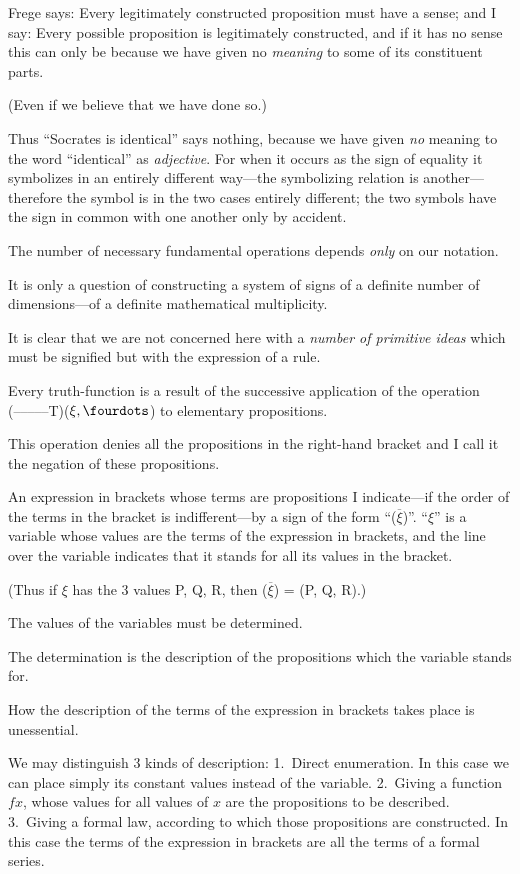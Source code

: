 {Frege says: Every legitimately constructed
proposition must have a sense; and I say: Every
possible proposition is legitimately constructed,
and if it has no sense this can only be because
we have given no \emph{meaning} to some of its constituent
parts.

(Even if we believe that we have done
so.)

Thus ``Socrates is identical'' says nothing,
because we have given \emph{no} meaning to the word
``identical'' as \emph{adjective}. For when it occurs as
the sign of equality it symbolizes in an entirely
different way---the symbolizing relation is another---therefore
the symbol is in the two cases entirely
different; the two symbols have the sign in
common with one another only by accident.}


{The number of necessary fundamental operations
depends \emph{only} on our notation.}


{It is only a question of constructing a system
of signs of a definite number of di\-men\-sions---of
a definite mathematical multiplicity.}


{It is clear that we are not concerned here with
a \emph{number of primitive ideas} which must be signified
but with the expression of a rule.}


{Every truth-function is a result of the successive
application of the operation \mbox{(--\;--\;--\;--\;--T)}\AllowBreak($\xi, \fourdots$) to
elementary propositions.

This operation denies all the propositions in
the right-hand bracket and I call it the negation
of these propositions.}


{An expression in brackets whose terms are
propositions I in\-di\-cate---if the order of the terms
in the bracket is indifferent---by a sign of the form
``($\overline{\xi}$)''. ``$\xi$'' is a variable whose values are the
terms of the expression in brackets, and the line
over the variable indicates that it stands for all
its values in the bracket.

(Thus if $\xi$ has the 3 values P, Q, R, then
($\overline{\xi}$) = (P, Q, R).)

The values of the variables must be determined.

{\stretchyspace
The determination is the description of the propositions
which the variable stands for.}

How the description of the terms of the expression
in brackets takes place is unessential.

We may distinguish 3 kinds of description:
1.~Direct enumeration. In this case we can place
simply its constant values instead of the variable.
2.~Giving a function $fx$, whose values for all
values of $x$ are the propositions to be described.
3.~Giving a formal law, according to which those
propositions are constructed. In this case the
terms of the expression in brackets are all the
terms of a formal series.}



